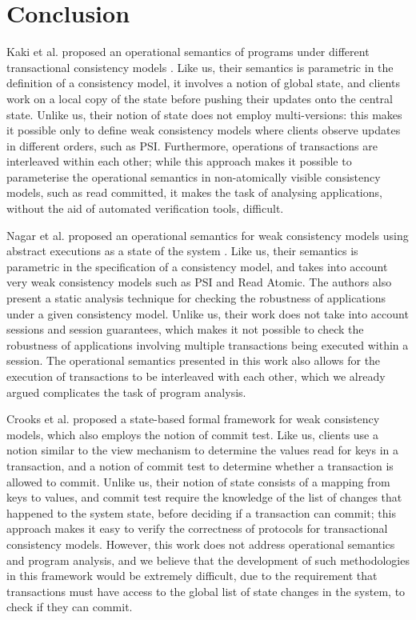 \section{Conclusion}
 

Kaki et al. proposed an operational semantics of programs 
under different transactional consistency models \cite{alonetogether}. Like us, 
their semantics is parametric in the definition of a consistency model, it 
involves a notion of global state, 
and clients work on a local copy of the state 
before pushing their updates onto the central state. Unlike 
us, their notion of state does not employ multi-versions: 
this makes it possible only to define weak consistency models 
where clients observe updates in different orders, such as PSI. 
Furthermore, operations of transactions are interleaved within each 
other; while this approach makes it possible to parameterise the 
operational semantics in non-atomically visible consistency models, 
such as read committed, it makes the task of analysing applications, without the aid 
of automated verification tools, difficult.

Nagar et al. proposed an operational semantics for weak consistency 
models using abstract executions as a state of the system \cite{sureshConcur}. 
Like us, their semantics is parametric in the specification of a consistency model, 
and takes into account very weak consistency models such as PSI and Read Atomic. 
The authors also present a static analysis technique for checking the robustness of applications 
under a given consistency model. Unlike us, their work does not take into account 
sessions and session guarantees, which makes it not possible to check the robustness 
of applications involving multiple transactions being executed within a session. The 
operational semantics presented in this  work also allows for the execution of transactions to be interleaved 
with each other, which we already argued complicates the task of program analysis. 

Crooks et al. proposed a state-based formal framework for weak consistency models, 
which also employs the notion of commit test. Like us, clients use a notion similar 
to the view mechanism to determine the values read for keys in a transaction, 
and a notion of commit test to  determine whether a transaction is allowed to commit. 
Unlike us, their notion of state consists of a mapping from keys to values, and 
commit test require the knowledge of the list of changes that happened to the 
system state, before deciding if a transaction can commit; this approach 
makes it easy to verify the correctness of protocols for transactional consistency models. 
However, this work does not address operational semantics and program analysis, 
and we believe that the development of such methodologies in this framework 
would be extremely difficult, due to the requirement that transactions must have 
access to the global list of state changes in the system, to check if they can commit.


